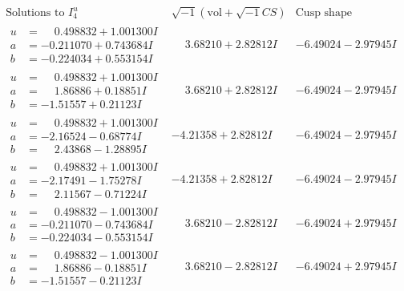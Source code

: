 \documentclass[1p]{elsarticle_modified}
\theoremstyle{definition}
\newcommand{\I}{\sqrt{-1}}
\begin{document}
$$\begin{array}{c|c|c}  
\text{Solutions to }I^u_{4}& \I (\text{vol} + \sqrt{-1}CS) & \text{Cusp shape}\\
 \hline 
\begin{aligned}
u &= \phantom{-}0.498832 + 1.001300 I \\
a &= -0.211070 + 0.743684 I \\
b &= -0.224034 + 0.553154 I\end{aligned}
 & \phantom{-}3.68210 + 2.82812 I & -6.49024 - 2.97945 I \\ \hline\begin{aligned}
u &= \phantom{-}0.498832 + 1.001300 I \\
a &= \phantom{-}1.86886 + 0.18851 I \\
b &= -1.51557 + 0.21123 I\end{aligned}
 & \phantom{-}3.68210 + 2.82812 I & -6.49024 - 2.97945 I \\ \hline\begin{aligned}
u &= \phantom{-}0.498832 + 1.001300 I \\
a &= -2.16524 - 0.68774 I \\
b &= \phantom{-}2.43868 - 1.28895 I\end{aligned}
 & -4.21358 + 2.82812 I & -6.49024 - 2.97945 I \\ \hline\begin{aligned}
u &= \phantom{-}0.498832 + 1.001300 I \\
a &= -2.17491 - 1.75278 I \\
b &= \phantom{-}2.11567 - 0.71224 I\end{aligned}
 & -4.21358 + 2.82812 I & -6.49024 - 2.97945 I \\ \hline\begin{aligned}
u &= \phantom{-}0.498832 - 1.001300 I \\
a &= -0.211070 - 0.743684 I \\
b &= -0.224034 - 0.553154 I\end{aligned}
 & \phantom{-}3.68210 - 2.82812 I & -6.49024 + 2.97945 I \\ \hline\begin{aligned}
u &= \phantom{-}0.498832 - 1.001300 I \\
a &= \phantom{-}1.86886 - 0.18851 I \\
b &= -1.51557 - 0.21123 I\end{aligned}
 & \phantom{-}3.68210 - 2.82812 I & -6.49024 + 2.97945 I \\ \hline\begin{aligned}

\end{aligned}
\end{array}$$
\end{document}
